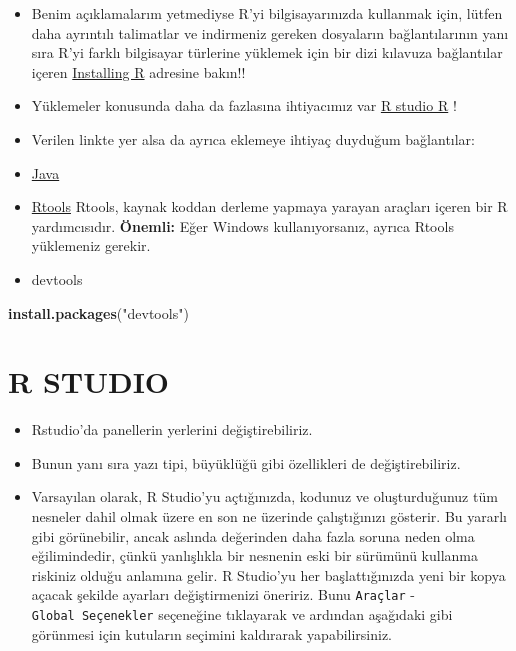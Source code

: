 \documentclass[
  oneside]{book}
\newenvironment{Shaded}{\begin{snugshade}}{\end{snugshade}}
\newcommand{\FunctionTok}[1]{\textcolor[rgb]{0.13,0.29,0.53}{\textbf{#1}}}
\newcommand{\NormalTok}[1]{#1}
\newcommand{\StringTok}[1]{\textcolor[rgb]{0.31,0.60,0.02}{#1}}
\begin{document}
\begin{itemize}
\item
  Benim açıklamalarım yetmediyse R'yi bilgisayarınızda kullanmak için, lütfen daha ayrıntılı talimatlar ve indirmeniz gereken dosyaların bağlantılarının yanı sıra R'yi farklı bilgisayar türlerine yüklemek için bir dizi kılavuza bağlantılar içeren \href{https://psyteachr.github.io/data-skills-v1/installing-r.html}{Installing R} adresine bakın!!
\item
  Yüklemeler konusunda daha da fazlasına ihtiyacımız var \href{https://psyteachr.github.io/data-skills-v1/appendix-updating-r.html}{R studio R} !
\item
  Verilen linkte yer alsa da ayrıca eklemeye ihtiyaç duyduğum bağlantılar:
\item
  \href{https://javadl.oracle.com/webapps/download/AutoDL?BundleId=245479_4d5417147a92418ea8b615e228bb6935}{Java}
\item
  \href{https://cloud.r*\%20project.org/bin/windows/Rtools}{Rtools} Rtools, kaynak koddan derleme yapmaya yarayan araçları içeren bir R yardımcısıdır. \textbf{Önemli:} Eğer Windows kullanıyorsanız, ayrıca Rtools yüklemeniz gerekir.
\item
  devtools
\end{itemize}

\begin{Shaded}
\begin{Highlighting}[]
\FunctionTok{install.packages}\NormalTok{(}\StringTok{"devtools"}\NormalTok{)}
\end{Highlighting}
\end{Shaded}

\hypertarget{r-studio}{%
\section{R STUDIO}\label{r-studio}}

\begin{itemize}
\item
  Rstudio'da panellerin yerlerini değiştirebiliriz.
\item
  Bunun yanı sıra yazı tipi, büyüklüğü gibi özellikleri de değiştirebiliriz.
\item
  Varsayılan olarak, R Studio'yu açtığınızda, kodunuz ve oluşturduğunuz tüm nesneler dahil olmak üzere en son ne üzerinde çalıştığınızı gösterir. Bu yararlı gibi görünebilir, ancak aslında değerinden daha fazla soruna neden olma eğilimindedir, çünkü yanlışlıkla bir nesnenin eski bir sürümünü kullanma riskiniz olduğu anlamına gelir. R Studio'yu her başlattığınızda yeni bir kopya açacak şekilde ayarları değiştirmenizi öneririz. Bunu \texttt{Araçlar} - \texttt{Global\ Seçenekler} seçeneğine tıklayarak ve ardından aşağıdaki gibi görünmesi için kutuların seçimini kaldırarak yapabilirsiniz.
\end{itemize}
\end{document}
